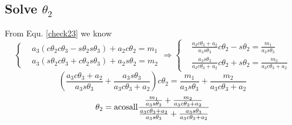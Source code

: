 \documentclass[utf8]{article}
\begin{document}
\subsection{Solve $\theta_2$}
%
From Equ. \ref{check23} we know
$$\left\{
\begin{aligned}
&a_3(c\theta_2c\theta_3 - s\theta_2s\theta_3) + a_2c\theta_2 = m_1\\
&a_3(s\theta_2c\theta_3 + c\theta_2s\theta_3) + a_2s\theta_2 = m_2
\end{aligned}
\right.\Rightarrow 
\left\{
\begin{aligned}
&\frac{a_3c\theta_3+a_2}{a_3s\theta_3}c\theta_2 - s\theta_2 = \frac{m_1}{a_3s\theta_3}\\
&\frac{a_3s\theta_3}{a_3c\theta_3 + a_2}c\theta_2 + s\theta_2 = \frac{m_2}{a_3c\theta_3 +a_2}
\end{aligned}
\right.
$$
$$(\frac{a_3c\theta_3+a_2}{a_3s\theta_3} + \frac{a_3s\theta_3}{a_3c\theta_3 + a_2})c\theta_2 = \frac{m_1}{a_3s\theta_3} +\frac{m_2}{a_3c\theta_3 +a_2}$$
\begin{equation}
\theta_2 = {\rm acosall}\frac{\frac{m_1}{a_3s\theta_3} +\frac{m_2}{a_3c\theta_3 +a_2}}{\frac{a_3c\theta_3+a_2}{a_3s\theta_3} + \frac{a_3s\theta_3}{a_3c\theta_3 + a_2}}
\end{equation}
\end{document}
